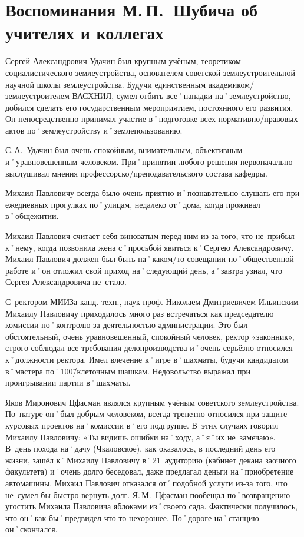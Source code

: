 ﻿\chapter[Воспоминания о коллегах]{Воспоминания М.\,П.~Шубича об учителях и коллегах}

Сергей Александрович Удачин был крупным учёным, теоретиком социалистического землеустройства, основателем советской землеустроительной научной школы землеустройства. Будучи единственным академиком\-/землеустроителем ВАСХНИЛ, сумел отбить все˚нападки на˚землеустройство, добился сделать его государственным мероприятием, постоянного его развития. Он непосредственно принимал участие в˚подготовке всех нормативно\-/правовых актов по˚землеустройству и˚землепользованию. 

С.\,А.~Удачин был очень спокойным, внимательным, объективным и˚уравновешенным человеком. При˚принятии любого решения первоначально выслушивал мнения профессорско\-/преподавательского состава кафедры. 

Михаил Павловичу всегда было очень приятно и˚познавательно слушать его при ежедневных прогулках по˚улицам, недалеко от˚дома, когда проживал в˚общежитии.

Михаил Павлович считает себя виноватым перед ним из-за того, что не~прибыл к˚нему, когда позвонила жена с˚просьбой явиться к˚Сергею Александровичу. Михаил Павлович должен был быть на˚каком\=/то совещании по˚общественной работе и˚он отложил свой приход на˚следующий день, а˚завтра узнал, что Сергея Александровича не~стало.
\enlargethispage{\baselineskip}	%
\pagebreak							%

С~ректором МИИЗа канд. техн., наук проф. Николаем Дмитриевичем Ильинским Михаилу Павловичу приходилось много раз встречаться как председателю комиссии по˚контролю за  деятельностью администрации. Это был обстоятельный, очень уравновешенный, спокойный человек, ректор «законник», строго соблюдал все требования делопроизводства и˚очень серьёзно относился к˚должности ректора. Имел влечение к˚игре в˚шахматы, будучи кандидатом в˚мастера по˚100\=/клеточным шашкам. Недовольство выражал при проигрывании партии в˚шахматы.

Яков Миронович Цфасман являлся крупным учёным советского землеустройства. По~натуре он˚был добрым человеком, всегда трепетно относился при защите курсовых проектов на˚комиссии в˚его подгруппе. В~этих случаях говорил Михаилу Павловичу: «Ты видишь ошибки на˚ходу, а˚я˚их не~замечаю». В~день похода на˚дачу (Чкаловское), как оказалось, в последний день его жизни, зашёл к˚Михаилу Павловичу в˚21~аудиторию (кабинет декана заочного факультета) и˚очень долго беседовал, даже предлагал деньги на˚приобретение автомашины. Михаил Павлович отказался от˚подобной услуги из-за того, что не~сумел бы быстро вернуть долг. Я.\,М.~Цфасман пообещал по˚возвращению угостить Михаила Павловича яблоками из˚своего сада. Фактически получилось, что он˚как бы˚предвидел что-то нехорошее. По˚дороге на˚станцию он˚скончался.

